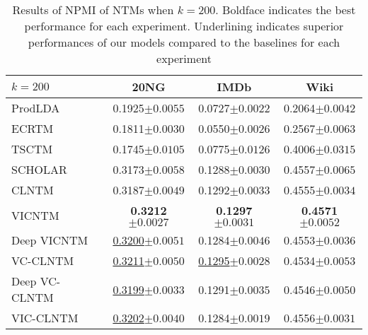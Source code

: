 \documentclass{article}
\begin{document}
\begin{table*}[ht]
\centering
\caption{Results of NPMI of NTMs when $k=200$. Boldface indicates the best performance for each experiment. Underlining indicates superior performances of our models compared to the baselines for each experiment}
\label{tab:results200}
\begin{tabular*}{\textwidth}{@{\extracolsep\fill}lccc}
    \hline
    $k=200$              & 20NG                   & IMDb                   & Wiki                   \\ \hline
    ProdLDA       & 0.1925{\tiny $\pm0.0055$}          & 0.0727{\tiny $\pm0.0022$}          & 0.2064{\tiny $\pm0.0042$}          \\
    ECRTM         & 0.1811{\tiny $\pm0.0030$}          & 0.0550{\tiny $\pm0.0026$}          & 0.2567{\tiny $\pm0.0063$}          \\
    TSCTM         & 0.1745{\tiny $\pm0.0105$}          & 0.0775{\tiny $\pm0.0126$}          & 0.4006{\tiny $\pm0.0315$}          \\
    SCHOLAR       & 0.3173{\tiny $\pm0.0058$}          & 0.1288{\tiny $\pm0.0030$}          & 0.4557{\tiny $\pm0.0065$}          \\
    CLNTM         & 0.3187{\tiny $\pm0.0049$}          & 0.1292{\tiny $\pm0.0033$}          & 0.4555{\tiny $\pm0.0034$}          \\ \hline
    VICNTM        & {\bf 0.3212{\tiny $\pm0.0027$}} & {\bf 0.1297{\tiny $\pm0.0031$}} & {\bf 0.4571{\tiny $\pm0.0052$}}          \\
    Deep VICNTM   & \underline{0.3200{\tiny $\pm0.0051$}}          & 0.1284{\tiny $\pm0.0046$}          & 0.4553{\tiny $\pm0.0036$} \\
    VC-CLNTM      & \underline{0.3211{\tiny $\pm0.0050$}}          & \underline{0.1295}{\tiny $\pm0.0028$}    & 0.4534{\tiny $\pm0.0053$}          \\
    Deep VC-CLNTM & \underline{0.3199{\tiny $\pm0.0033$}}          & 0.1291{\tiny $\pm0.0035$}          & 0.4546{\tiny $\pm0.0050$}          \\
    VIC-CLNTM     & \underline{0.3202{\tiny $\pm0.0040$}}          & 0.1284{\tiny $\pm0.0019$}          & 0.4556{\tiny $\pm0.0031$}          \\ \hline
    \end{tabular*}
\end{table*}
\end{document}
